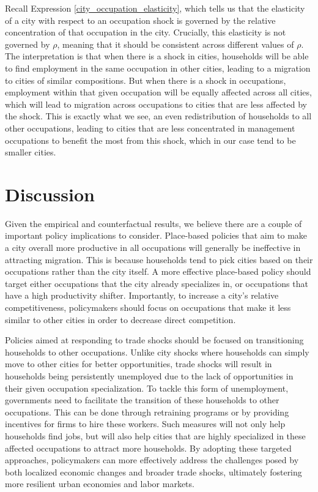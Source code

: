 \documentclass[10pt]{article}
\begin{document}
Recall Expression \ref{city_occupation_elasticity}, which tells us that the elasticity of a city with respect to an occupation shock is governed by the relative concentration of that occupation in the city. Crucially, this elasticity is not governed by $\rho$, meaning that it should be consistent across different values of $\rho$. The interpretation is that when there is a shock in cities, households will be able to find employment in the same occupation in other cities, leading to a migration to cities of similar compositions. But when there is a shock in occupations, employment within that given occupation will be equally affected across all cities, which will lead to migration across occupations to cities that are less affected by the shock. This is exactly what we see, an even redistribution of households to all other occupations, leading to cities that are less concentrated in management occupations to benefit the most from this shock, which in our case tend to be smaller cities.

\section{Discussion}

Given the empirical and counterfactual results, we believe there are a couple of important policy implications to consider. Place-based policies that aim to make a city overall more productive in all occupations will generally be ineffective in attracting migration. This is because households tend to pick cities based on their occupations rather than the city itself. A more effective place-based policy should target either occupations that the city already specializes in, or occupations that have a high productivity shifter. Importantly, to increase a city's relative competitiveness, policymakers should focus on occupations that make it less similar to other cities in order to decrease direct competition.

Policies aimed at responding to trade shocks should be focused on transitioning households to other occupations. Unlike city shocks where households can simply move to other cities for better opportunities, trade shocks will result in households being persistently unemployed due to the lack of opportunities in their given occupation specialization. To tackle this form of unemployment, governments need to facilitate the transition of these households to other occupations. This can be done through retraining programs or by providing incentives for firms to hire these workers. Such measures will not only help households find jobs, but will also help cities that are highly specialized in these affected occupations to attract more households. By adopting these targeted approaches, policymakers can more effectively address the challenges posed by both localized economic changes and broader trade shocks, ultimately fostering more resilient urban economies and labor markets.
\end{document}
